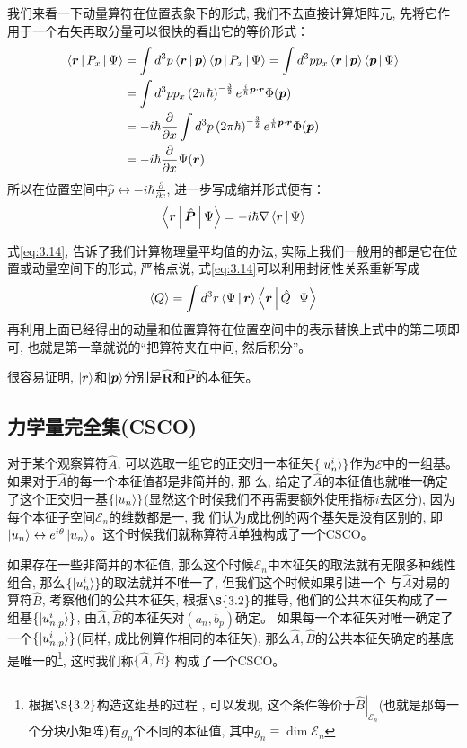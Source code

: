 \documentclass[a4paper,zihao=-4,linespread=1]{ctexrep}
\begin{document}
    我们来看一下动量算符在位置表象下的形式, 我们不去直接计算矩阵元, 先将它作用于一个右矢再取分量可以很快的看出它的等价形式：
    \begin{align*}
        \Braket{\bm{r}|P_x|\Psi}&=\int d^3p\Braket{\bm{r}|\bm{p}}\Braket{\bm{p}|P_x|\Psi}=\int d^3pp_x\Braket{\bm{r}|\bm{p}}\Braket{\bm{p}|\Psi}\\
        &=\int d^3pp_x\left(2\pi\hbar\right)^{-\frac{3}{2}}e^{\frac{i}{\hbar}\bm{p}\cdot\bm{r}}\Phi(\bm{p})\\
        &=-i\hbar\frac{\partial}{\partial x}\int d^3p\left(2\pi\hbar\right)^{-\frac{3}{2}}e^{\frac{i}{\hbar}\bm{p}\cdot\bm{r}}\Phi(\bm{p})\\
        &=-i\hbar\frac{\partial}{\partial x}\Psi(\bm{r})
    \end{align*}
    所以在位置空间中$\hat p\leftrightarrow -i\hbar\frac{\partial}{\partial x}$, 进一步写成缩并形式便有：
    \begin{equation}
        \Braket{\bm{r}|\hat{\bm{P}}|\Psi}=-i\hbar\nabla\Braket{\bm{r}|\Psi}
    \end{equation}
    
    式\ref{eq:3.14}, 告诉了我们计算物理量平均值的办法, 实际上我们一般用的都是它在位置或动量空间下的形式, 严格点说, 式\ref{eq:3.14}可以利用封闭性关系重新写成
    \[\Braket{Q}=\int d^3r\Braket{\Psi|\bm{r}}\Braket{\bm{r}|\hat Q|\Psi}\]
    再利用上面已经得出的动量和位置算符在位置空间中的表示替换上式中的第二项即可, 也就是第一章就说的“把算符夹在中间, 然后积分”。

    很容易证明, $\ket{\bm{r}}$和$\ket{\bm{p}}$分别是$\hat {\bm{R}}$和$\hat {\bm{P}}$的本征矢。
    \subsection*{力学量完全集(CSCO)}
    对于某个观察算符$\hat{A}$, 可以选取一组它的正交归一本征矢$\{\ket{u^i_n}\}$作为$\mathscr{E}$中的一组基。如果对于$\hat A$的每一个本征值都是非简并的, 那
    么, 给定了$\hat{A}$的本征值也就唯一确定了这个正交归一基$\{\ket{u_n}\}$(显然这个时候我们不再需要额外使用指标$i$去区分), 因为每个本征子空间$\mathscr{E}_n$的维数都是一, 我
    们认为成比例的两个基矢是没有区别的, 即$\ket{u_n}\leftrightarrow e^{i\theta}\ket{u_n}$。这个时候我们就称算符$\hat{A}$单独构成了一个CSCO。
    
    如果存在一些非简并的本征值, 那么这个时候$\mathscr{E}_n$中本征矢的取法就有无限多种线性组合, 那么$\{\ket{u_n^i}\}$的取法就并不唯一了, 但我们这个时候如果引进一个
    与$\hat{A}$对易的算符$\hat{B}$, 考察他们的公共本征矢, 根据$\S{3.2}$的推导, 他们的公共本征矢构成了一组基$\{\ket{u_{n,p}^i}\}$, 由$\hat{A},\hat{B}$的本征矢对$\left(a_n,b_p\right)$确定。
    如果每一个本征矢对唯一确定了一个$\{\ket{u_{n,p}^i}\}$(同样, 成比例算作相同的本征矢), 那么$\hat{A},\hat{B}$的公共本征矢确定的基底是唯一的\footnote{根据$\S{3.2}$构造这组基的过程
    , 可以发现, 这个条件等价于${\left. {\hat B} \right|_{\mathscr{E}_n}}$(也就是那每一个分块小矩阵)有$g_n$个不同的本征值, 其中$g_n\equiv \dim \mathscr{E}_n$}, 这时我们称$\{\hat{A},\hat{B}\}$
    构成了一个CSCO。
    
\end{document}

